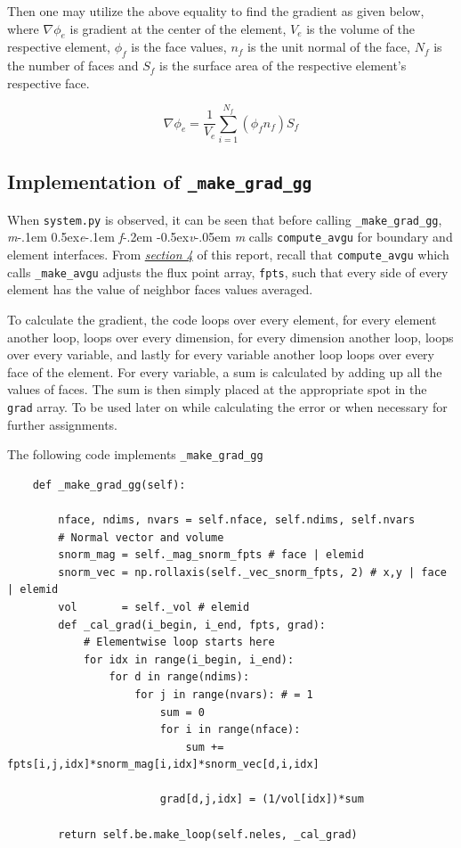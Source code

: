 \documentclass[a4paper, 12pt]{article}
\newcommand\mefvm{%
    \textit{m}\kern-.1em%
    \raise0.5ex\hbox{\textit{e}}\kern-.1em%
    \textit{f}\kern-.2em%
    \raise-0.5ex\hbox{\textit{v}}\kern-.05em%
    \textit{m}
}
\begin{document}
Then one may utilize the above equality to find the gradient as given below, where \(\nabla\phi_{e}\) is gradient at the center of the element, \(V_{e}\) is the volume of the respective element, \(\phi_{f}\) is the face values, \(n_{f}\) is the unit normal of the face, \(N_{f}\) is the number of faces and \(S_{f}\) is the surface area of the respective element's respective face.

\begin{equation}
    \nabla\phi_{e} = \frac{1}{V_{e}}\sum_{i = 1}^{N_{f}}{\left( \phi_{f}n_{f} \right)S_{f}}
\end{equation}

\subsection{Implementation of \texttt{\_make\_grad\_gg}}

When \verb|system.py| is observed, it can be seen that before calling \verb|_make_grad_gg|, \mefvm calls \verb|compute_avgu| for boundary and element interfaces. From \hyperref[avgu]{\textit{section 4}} of this report, recall that \verb|compute_avgu| which calls \verb|_make_avgu| adjusts the flux point array, \verb|fpts|, such that every side of every element has the value of neighbor faces values averaged. \\\par

To calculate the gradient, the code loops over every element, for every element another loop, loops over every dimension, for every dimension another loop, loops over every variable, and lastly for every variable another loop loops over every face of the element. For every variable, a sum is calculated by adding up all the values of faces. The sum is then simply placed at the appropriate spot in the \verb|grad| array. To be used later on while calculating the error or when necessary for further assignments.\newpage\par

The following code implements \verb|_make_grad_gg|

\begin{verbatim}
    def _make_grad_gg(self):

        nface, ndims, nvars = self.nface, self.ndims, self.nvars
        # Normal vector and volume
        snorm_mag = self._mag_snorm_fpts # face | elemid
        snorm_vec = np.rollaxis(self._vec_snorm_fpts, 2) # x,y | face | elemid
        vol       = self._vol # elemid
        def _cal_grad(i_begin, i_end, fpts, grad):
            # Elementwise loop starts here
            for idx in range(i_begin, i_end):
                for d in range(ndims):
                    for j in range(nvars): # = 1
                        sum = 0
                        for i in range(nface):
                            sum += fpts[i,j,idx]*snorm_mag[i,idx]*snorm_vec[d,i,idx]

                        grad[d,j,idx] = (1/vol[idx])*sum

        return self.be.make_loop(self.neles, _cal_grad)
\end{verbatim}
\par
\end{document}
